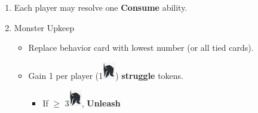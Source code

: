\documentclass[12pt]{article}
\newenvironment{enumerateCustom}
{\begin{enumerate}
  \setlength{\itemsep}{1pt}
  \setlength{\parskip}{0pt}
  \setlength{\parsep}{0pt}}
{\end{enumerate}}
\newenvironment{itemizeCustom}
{\begin{itemize}
  \setlength{\itemsep}{1pt}
  \setlength{\parskip}{0pt}
  \setlength{\parsep}{0pt}}
{\end{itemize}}
\begin{document}
\begin{mdframed}[style=SummaryCard, align=center, userdefinedwidth=35em, frametitle={Round Order Guide}]

    \begin{enumerateCustom}
        \item Each player may resolve one \textbf{Consume} ability.
        \item Monster Upkeep
            \begin{itemizeCustom}
                \item Replace behavior card with lowest number (or all tied cards).
                \item Gain 1 per player (1\includegraphics[scale=0.40]{images/per_player.png}) \textbf{struggle} tokens.
                    \begin{itemizeCustom}
                        \item If $\ge$ 3\includegraphics[scale=0.40]{images/per_player.png}, \textbf{Unleash}
                    \end{itemizeCustom}
            \end{itemizeCustom}


\end{enumerateCustom}
\end{mdframed}
\end{document}
